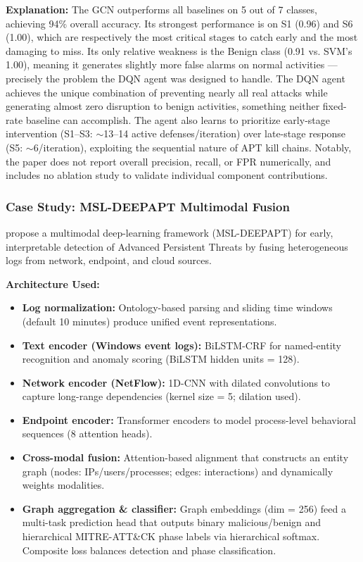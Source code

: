 \textbf{Explanation:} The GCN outperforms all baselines on 5 out of 7 classes, achieving 94\% overall accuracy. Its strongest performance is on S1 (0.96) and S6 (1.00), which are respectively the most critical stages to catch early and the most damaging to miss. Its only relative weakness is the Benign class (0.91 vs. SVM's 1.00), meaning it generates slightly more false alarms on normal activities --- precisely the problem the DQN agent was designed to handle. The DQN agent achieves the unique combination of preventing nearly all real attacks while generating almost zero disruption to benign activities, something neither fixed-rate baseline can accomplish. The agent also learns to prioritize early-stage intervention (S1--S3: $\sim$13--14 active defenses/iteration) over late-stage response (S5: $\sim$6/iteration), exploiting the sequential nature of APT kill chains. Notably, the paper does not report overall precision, recall, or FPR numerically, and includes no ablation study to validate individual component contributions.

\subsubsection{Case Study: MSL-DEEPAPT Multimodal Fusion \protect\cite{wang2025msldeepapt}}

\cite{wang2025msldeepapt} propose a multimodal deep-learning framework (MSL-DEEPAPT) for early, interpretable detection of Advanced Persistent Threats by fusing heterogeneous logs from network, endpoint, and cloud sources.

\textbf{Architecture Used:}

\begin{itemize}
    \item \textbf{Log normalization:} Ontology-based parsing and sliding time windows (default 10 minutes) produce unified event representations.
    \item \textbf{Text encoder (Windows event logs):} BiLSTM-CRF for named-entity recognition and anomaly scoring (BiLSTM hidden units = 128).
    \item \textbf{Network encoder (NetFlow):} 1D-CNN with dilated convolutions to capture long-range dependencies (kernel size = 5; dilation used).
    \item \textbf{Endpoint encoder:} Transformer encoders to model process-level behavioral sequences (8 attention heads).
    \item \textbf{Cross-modal fusion:} Attention-based alignment that constructs an entity graph (nodes: IPs/users/processes; edges: interactions) and dynamically weights modalities.
    \item \textbf{Graph aggregation \& classifier:} Graph embeddings (dim = 256) feed a multi-task prediction head that outputs binary malicious/benign and hierarchical MITRE-ATT\&CK phase labels via hierarchical softmax. Composite loss balances detection and phase classification.
\end{itemize}

